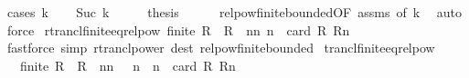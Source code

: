 \begin{isabellebody}
%
\isadelimproof
%
\endisadelimproof
%
\isatagproof
{}\isamarkupfalse%
\ {\isacharparenleft}{\kern0pt}cases\ k{\isacharparenright}{\kern0pt}\isanewline
\ \ \isamarkupfalse%
\ {\isacharparenleft}{\kern0pt}Suc\ k{\isacharprime}{\kern0pt}{\isacharparenright}{\kern0pt}\isanewline
\ \ \isamarkupfalse%
\ \isamarkupfalse%
\ {\isacharquery}{\kern0pt}thesis\isanewline
\ \ \ \ \isamarkupfalse%
\ relpow{\isacharunderscore}{\kern0pt}finite{\isacharunderscore}{\kern0pt}bounded{}{\isacharbrackleft}{\kern0pt}OF\ assms{\isacharcomma}{\kern0pt}\ of\ k{\isacharbrackright}{\kern0pt}\ \isamarkupfalse%
\ auto\isanewline
{}\isamarkupfalse%
\ force%
\endisatagproof
{\isafoldproof}%
%
\isadelimproof
\isanewline
%
\endisadelimproof
\isanewline
{}\isamarkupfalse%
\ rtrancl{\isacharunderscore}{\kern0pt}finite{\isacharunderscore}{\kern0pt}eq{\isacharunderscore}{\kern0pt}relpow{\isacharcolon}{\kern0pt}\ {\isachardoublequoteopen}finite\ R\ {\isasymLongrightarrow}\ R\isactrlsup {\isacharasterisk}{\kern0pt}\ {\isacharequal}{\kern0pt}\ {\isacharparenleft}{\kern0pt}{\isasymUnion}n{\isasymin}{\isacharbraceleft}{\kern0pt}n{\isachardot}{\kern0pt}\ n\ {\isasymle}\ card\ R{\isacharbraceright}{\kern0pt}{\isachardot}{\kern0pt}\ R{\isacharcircum}{\kern0pt}{\isacharcircum}{\kern0pt}n{\isacharparenright}{\kern0pt}{\isachardoublequoteclose}\isanewline
%
\isadelimproof
\ \ %
\endisadelimproof
%
\isatagproof
{}\isamarkupfalse%
\ {\isacharparenleft}{\kern0pt}fastforce\ simp{\isacharcolon}{\kern0pt}\ rtrancl{\isacharunderscore}{\kern0pt}power\ dest{\isacharcolon}{\kern0pt}\ relpow{\isacharunderscore}{\kern0pt}finite{\isacharunderscore}{\kern0pt}bounded{\isacharparenright}{\kern0pt}%
\endisatagproof
{\isafoldproof}%
%
\isadelimproof
\isanewline
%
\endisadelimproof
\isanewline
{}\isamarkupfalse%
\ trancl{\isacharunderscore}{\kern0pt}finite{\isacharunderscore}{\kern0pt}eq{\isacharunderscore}{\kern0pt}relpow{\isacharcolon}{\kern0pt}\isanewline
\ \ \ {\isachardoublequoteopen}finite\ R{\isachardoublequoteclose}\ \ {\isachardoublequoteopen}R\isactrlsup {\isacharplus}{\kern0pt}\ {\isacharequal}{\kern0pt}\ {\isacharparenleft}{\kern0pt}{\isasymUnion}n{\isasymin}{\isacharbraceleft}{\kern0pt}n{\isachardot}{\kern0pt}\ {}\ {\isacharless}{\kern0pt}\ n\ {\isasymand}\ n\ {\isasymle}\ card\ R{\isacharbraceright}{\kern0pt}{\isachardot}{\kern0pt}\ R{\isacharcircum}{\kern0pt}{\isacharcircum}{\kern0pt}n{\isacharparenright}{\kern0pt}{\isachardoublequoteclose}\isanewline

\end{isabellebody}
